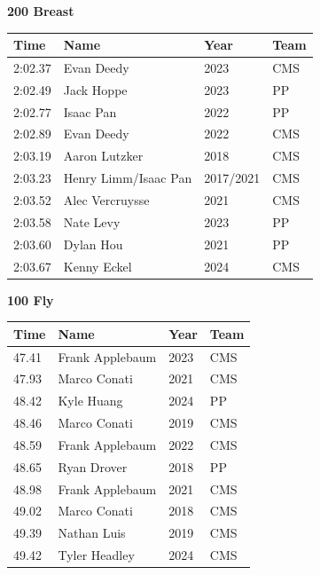 \vspace{1.2em}
\noindent\begin{minipage}[t]{0.98\textwidth}
\centering
\textbf{\textcolor{teamprimary}{200 Breast}}\par
\vspace{0.5em}
\centering
\small
\renewcommand{\arraystretch}{1.0}
\setlength{\tabcolsep}{4pt}
\begin{tabular}{@{}p{2.5cm}p{4.5cm}p{1.5cm}p{2.5cm}@{}}
\toprule
\textbf{Time} & \textbf{Name} & \textbf{Year} & \textbf{Team} \\
\midrule
2:02.37 & Evan Deedy & 2023 & CMS \\
2:02.49 & Jack Hoppe & 2023 & PP \\
2:02.77 & Isaac Pan & 2022 & PP \\
2:02.89 & Evan Deedy & 2022 & CMS \\
2:03.19 & Aaron Lutzker & 2018 & CMS \\
2:03.23 & Henry Limm/Isaac Pan & 2017/2021 & CMS \\
2:03.52 & Alec Vercruysse & 2021 & CMS \\
2:03.58 & Nate Levy & 2023 & PP \\
2:03.60 & Dylan Hou & 2021 & PP \\
2:03.67 & Kenny Eckel & 2024 & CMS \\
\bottomrule
\end{tabular}
\end{minipage}
\vspace{1.2em}
\noindent\begin{minipage}[t]{0.98\textwidth}
\centering
\textbf{\textcolor{teamprimary}{100 Fly}}\par
\vspace{0.5em}
\centering
\small
\renewcommand{\arraystretch}{1.0}
\setlength{\tabcolsep}{4pt}
\begin{tabular}{@{}p{2.5cm}p{4.5cm}p{1.5cm}p{2.5cm}@{}}
\toprule
\textbf{Time} & \textbf{Name} & \textbf{Year} & \textbf{Team} \\
\midrule
47.41 & Frank Applebaum & 2023 & CMS \\
47.93 & Marco Conati & 2021 & CMS \\
48.42 & Kyle Huang & 2024 & PP \\
48.46 & Marco Conati & 2019 & CMS \\
48.59 & Frank Applebaum & 2022 & CMS \\
48.65 & Ryan Drover & 2018 & PP \\
48.98 & Frank Applebaum & 2021 & CMS \\
49.02 & Marco Conati & 2018 & CMS \\
49.39 & Nathan Luis & 2019 & CMS \\
49.42 & Tyler Headley & 2024 & CMS \\
\bottomrule
\end{tabular}
\end{minipage}
